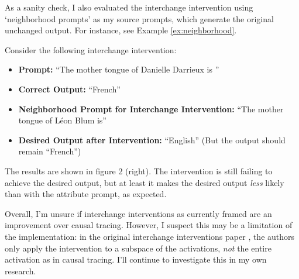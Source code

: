 \documentclass{article}
\begin{document}

As a sanity check, I also evaluated the interchange intervention using `neighborhood prompts' as my source prompts, which generate the original unchanged output. For instance, see Example \ref{ex:neighborhood}.

\begin{example}\label{ex:neighborhood}
  Consider the following interchange intervention:
  \begin{itemize}
      \item \textbf{Prompt:} ``The mother tongue of Danielle Darrieux is ''
      \item \textbf{Correct Output:} ``French''
      \item \textbf{Neighborhood Prompt for Interchange Intervention:} ``The mother tongue of Léon Blum is''
      \item \textbf{Desired Output after Intervention:} ``English'' (But the output should remain ``French'')
  \end{itemize}
  The results are shown in figure 2 (right). The intervention is still failing to achieve the desired output, but at least it makes the desired output \emph{less} likely than with the attribute prompt, as expected.
  \end{example}


Overall, I'm unsure if interchange interventions as currently framed are an improvement over causal tracing. However, I suspect this may be a limitation of the implementation: in the original interchange interventions paper \cite{geiger2023finding}, the authors only apply the intervention to a subspace of the activations, \emph{not} the entire activation as in causal tracing. I'll continue to investigate this in my own research.
\end{document}
